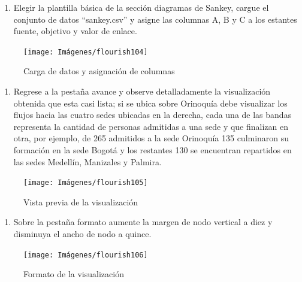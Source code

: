 \documentclass[
]{book}
\providecommand{\tightlist}{%
  \setlength{\itemsep}{0pt}\setlength{\parskip}{0pt}}
\begin{document}
\begin{enumerate}
\def\labelenumi{\arabic{enumi}.}
\tightlist
\item
  Elegir la plantilla básica de la sección diagramas de Sankey, cargue el conjunto de datos ``sankey.csv'' y asigne las columnas A, B y C a los estantes fuente, objetivo y valor de enlace.
\end{enumerate}

\begin{figure}

{\centering \texttt{[image: Imágenes/flourish104]} 

}

\caption{Carga de datos y asignación de columnas}\label{fig:paso1sankeyflourish-fig}
\end{figure}

\begin{enumerate}
\def\labelenumi{\arabic{enumi}.}
\setcounter{enumi}{1}
\tightlist
\item
  Regrese a la pestaña avance y observe detalladamente la visualización obtenida que esta casi lista; si se ubica sobre Orinoquía debe visualizar los flujos hacia las cuatro sedes ubicadas en la derecha, cada una de las bandas representa la cantidad de personas admitidas a una sede y que finalizan en otra, por ejemplo, de 265 admitidos a la sede Orinoquía 135 culminaron su formación en la sede Bogotá y los restantes 130 se encuentran repartidos en las sedes Medellín, Manizales y Palmira.
\end{enumerate}

\begin{figure}

{\centering \texttt{[image: Imágenes/flourish105]} 

}

\caption{Vista previa de la visualización}\label{fig:paso2sankeyflourish-fig}
\end{figure}

\begin{enumerate}
\def\labelenumi{\arabic{enumi}.}
\setcounter{enumi}{2}
\tightlist
\item
  Sobre la pestaña formato aumente la margen de nodo vertical a diez y disminuya el ancho de nodo a quince.
\end{enumerate}

\begin{figure}

{\centering \texttt{[image: Imágenes/flourish106]} 

}

\caption{Formato de la visualización}\label{fig:paso3sankeyflourish-fig}
\end{figure}
\end{document}
